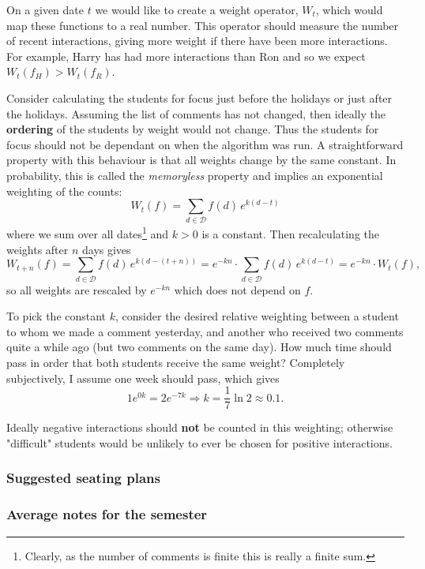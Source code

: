 \documentclass[10pt]{article}
\begin{document}
On a given date $t$ we would like to create a weight operator, $W_t$, which would map these functions to a real number. This operator should measure the number of recent interactions, giving more weight if there have been more interactions. For example, Harry has had more interactions than Ron and so we expect $W_t(f_H) > W_t(f_R)$.

Consider calculating the students for focus just before the holidays or just after the holidays. Assuming the list of comments has not changed, then ideally the \textbf{ordering} of the students by weight would not change. Thus the students for focus should not be dependant on when the algorithm was run. A straightforward property with this behaviour is that all weights change by the same constant. In probability, this is called the \emph{memoryless} property \cite{Norr98} and implies an exponential weighting of the counts:
$$ W_t(f) = \sum_{d \in \mathcal{D}} f(d) \, e^{k(d-t)} $$
where we sum over all dates\footnote{Clearly, as the number of comments is finite this is really a finite sum.}  and $k>0$ is a constant. Then recalculating the weights after $n$ days gives
$$W_{t+n}(f) = \sum_{d \in \mathcal{D}} f(d) \, e^{k(d-(t+n))} =  e^{-kn} \cdot \sum_{d \in \mathcal{D}} f(d) \, e^{k(d-t)} = e^{-kn} \cdot  W_t(f),$$
so all weights are rescaled by $e^{-kn}$ which does not depend on $f$.

To pick the constant $k$, consider the desired relative weighting between a student to whom we made a comment yesterday, and another who received two comments quite a while ago (but two comments on the same day). How much time should pass in order that both students receive the same weight? Completely subjectively, I assume one week should pass, which gives
$$1 e^{0k} = 2 e^{-7k} \Rightarrow k = \frac{1}{7} \ln {2}  \approx 0.1.$$ 

Ideally negative interactions should \textbf{not} be counted in this weighting; otherwise "difficult" students would be unlikely to ever be chosen for positive interactions.

\subsubsection{Suggested seating plans}

\subsubsection{Average notes for the semester} \label{output_notes}
\end{document}
